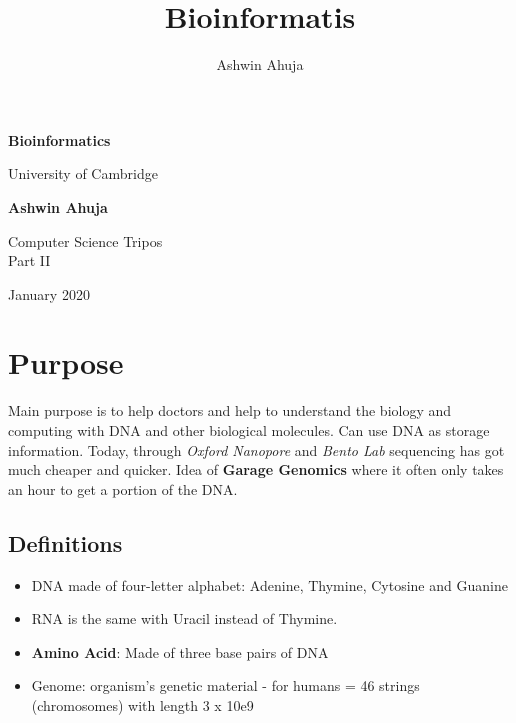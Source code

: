 \documentclass{article}
\title{Bioinformatis}
\author{Ashwin Ahuja}
\newenvironment{definition}{\par\color{blue}}{\par}
\begin{document}
\begin{titlepage}
\begin{center}
			\vspace*{1cm}
			
			\Huge
			\textbf{Bioinformatics}
			
			\vspace{0.5cm}
			\LARGE
			University of Cambridge
			
			\vspace{1.5cm}
			
			\textbf{Ashwin Ahuja}
			
			\vfill
			
			Computer Science Tripos \\
			Part II
			
			\vspace{5cm}
			
			January 2020
			
\end{center}
\end{titlepage}

\tableofcontents
\pagebreak

\section{Purpose}
Main purpose is to help doctors and help to understand the biology and computing with DNA and other biological molecules. Can use DNA as storage information. Today, through \textit{Oxford Nanopore} and \textit{Bento Lab} sequencing has got much cheaper and quicker. Idea of \textbf{Garage Genomics} where it often only takes an hour to get a portion of the DNA.

\subsection{Definitions}
\begin{definition}
\begin{itemize}
\item DNA made of four-letter alphabet: Adenine, Thymine, Cytosine and Guanine
\item RNA is the same with Uracil instead of Thymine. 
\item \textbf{Amino Acid}: Made of three base pairs of DNA
\item Genome: organism's genetic material - for humans = 46 strings (chromosomes) with length 3 x 10e9
\end{itemize}
\end{definition} 
\end{document}
